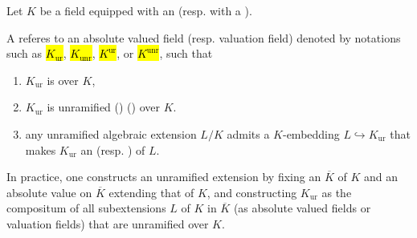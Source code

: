 \begin{definition} \label{definition:maximal_unramified_extension_of_an_absolute_valued_field_or_a_vlauation_field}

    Let $K$ be a field equipped with an  (resp. with a ).

    A  referes to an absolute valued field (resp. valuation field) denoted by notations such as \hl{$K_{\text{ur}}$}, \hl{$K_{\text{unr}}$}, \hl{$K^{\text{ur}}$}, or \hl{$K^{\text{unr}}$}, such that 
    \begin{enumerate}
        \item $K_{\text{ur}}$ is  over $K$,

        \item $K_{\text{ur}}$ is unramified () () over $K$.

        \item any unramified algebraic extension $L/K$ admits a $K$-embedding $L \hookrightarrow K_{\text{ur}}$ that makes $K_{\text{ur}}$ an  (resp. ) of $L$.
    \end{enumerate}

    In practice, one constructs an unramified extension by fixing an  $\overline{K}$ of $K$ and an absolute value on $\overline{K}$ extending that of $K$, and constructing $K_{\text{ur}}$ as the compositum of all subextensions $L$ of $K$ in $\overline{K}$ (as absolute valued fields or valuation fields) that are unramified over $K$.
\end{definition}